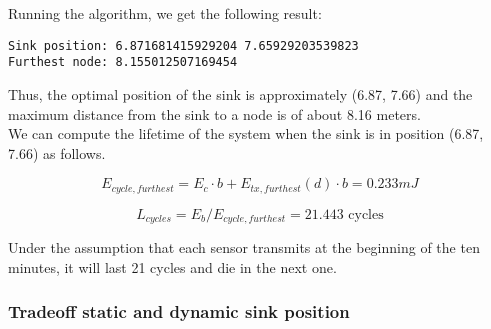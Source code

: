 Running the algorithm, we get the following result:
\begin{verbatim}
Sink position: 6.871681415929204 7.65929203539823
Furthest node: 8.155012507169454
\end{verbatim}

Thus, the optimal position of the sink is approximately (6.87, 7.66) and the maximum distance from the sink to a node is of about 8.16 meters.\\
We can compute the lifetime of the system when the sink is in position (6.87, 7.66) as follows.

\[
E_{cycle, furthest} = E_c \cdot b + E_{tx, furthest}(d) \cdot b = 0.233 mJ
\]

\[
L_{cycles} = E_b / E_{cycle, furthest} = 21.443 \text{ cycles}
\]

Under the assumption that each sensor transmits at the beginning of the ten minutes, it will last 21 cycles and die in the next one.

\subsubsection{Tradeoff static and dynamic sink position}
